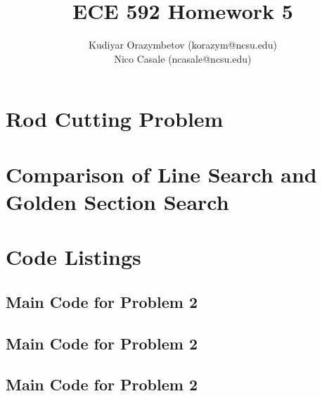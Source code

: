 \documentclass[]{../ncmathy}
\begin{document}
\title{ECE 592 Homework 5}
\author{Kudiyar Orazymbetov (korazym@ncsu.edu)\\Nico Casale (ncasale@ncsu.edu)}
\maketitle

\tableofcontents
\listoffigures
\lstlistoflistings

\pagebreak

\section{Rod Cutting Problem}
	

\pagebreak
\section{Comparison of Line Search and Golden Section Search}
	
	
\pagebreak
\section{Code Listings}
	
	
		\subsection{Main Code for Problem 2}
		
		
		\subsection{Main Code for Problem 2}
		
		
		\subsection{Main Code for Problem 2}
			

	
\end{document}
